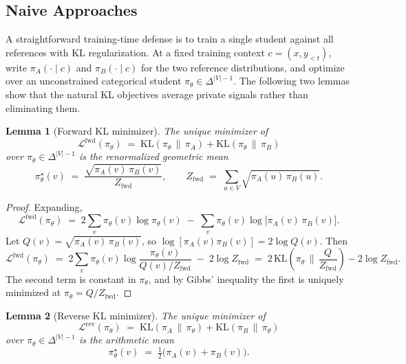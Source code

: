 \documentclass[11pt]{article}
\newtheorem{lemma}{Lemma}
\begin{document}
\subsection{Naive Approaches}
\label{sec:naive}

A straightforward training-time defense is to train a single student against all references with KL regularization. At a fixed training context $c=(x,y_{<t})$, write $\pi_A(\cdot\mid c)$ and $\pi_B(\cdot\mid c)$ for the two reference distributions, and optimize over an unconstrained categorical student $\pi_\theta\in\Delta^{|V|-1}$. The following two lemmas show that the natural KL objectives average private signals rather than eliminating them.

\begin{lemma}[Forward KL minimizer]
\label{lem:fwd}
The unique minimizer of
\[
\mathcal{L}^{\mathrm{fwd}}(\pi_\theta) \;=\; \mathrm{KL}(\pi_\theta \,\|\, \pi_A) + \mathrm{KL}(\pi_\theta \,\|\, \pi_B)
\]
over $\pi_\theta \in \Delta^{|V|-1}$ is the renormalized geometric mean
\[
\pi_\theta^\star(v) \;=\; \frac{\sqrt{\pi_A(v)\, \pi_B(v)}}{Z_{\mathrm{fwd}}}, \qquad Z_{\mathrm{fwd}} \;=\; \sum_{u \in V} \sqrt{\pi_A(u)\, \pi_B(u)}.
\]
\end{lemma}

\begin{proof}
Expanding,
\[
\mathcal{L}^{\mathrm{fwd}}(\pi_\theta) \;=\; 2 \sum_v \pi_\theta(v) \log \pi_\theta(v) \;-\; \sum_v \pi_\theta(v) \log\bigl[\pi_A(v)\, \pi_B(v)\bigr].
\]
Let $Q(v) = \sqrt{\pi_A(v)\, \pi_B(v)}$, so $\log[\pi_A(v)\pi_B(v)] = 2 \log Q(v)$. Then
\[
\mathcal{L}^{\mathrm{fwd}}(\pi_\theta) \;=\; 2 \sum_v \pi_\theta(v) \log \frac{\pi_\theta(v)}{Q(v)/Z_{\mathrm{fwd}}} \;-\; 2 \log Z_{\mathrm{fwd}} \;=\; 2\, \mathrm{KL}\!\left(\pi_\theta \,\Big\|\, \frac{Q}{Z_{\mathrm{fwd}}}\right) - 2 \log Z_{\mathrm{fwd}}.
\]
The second term is constant in $\pi_\theta$, and by Gibbs' inequality the first is uniquely minimized at $\pi_\theta = Q/Z_{\mathrm{fwd}}$.
\end{proof}

\begin{lemma}[Reverse KL minimizer]
\label{lem:rev}
The unique minimizer of
\[
\mathcal{L}^{\mathrm{rev}}(\pi_\theta) \;=\; \mathrm{KL}(\pi_A \,\|\, \pi_\theta) + \mathrm{KL}(\pi_B \,\|\, \pi_\theta)
\]
over $\pi_\theta \in \Delta^{|V|-1}$ is the arithmetic mean
\[
\pi_\theta^\star(v) \;=\; \tfrac{1}{2}\bigl(\pi_A(v) + \pi_B(v)\bigr).
\]
\end{lemma}
\end{document}
